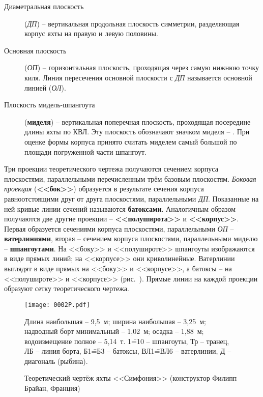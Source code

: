 \begin{description}
\item [Диаметральная плоскость]
  (\textit{ДП}) \--- вертикальная продольная плоскость симметрии,
  разделяющая корпус яхты на правую и левую половины.
\item [Основная плоскость] (\textit{ОП})
  \--- горизонтальная плоскость, проходящая через самую нижнюю точку
  киля. Линия пересечения основной плоскости с \textit{ДП} называется
  основной линией (\textit{ОЛ}).
\item [Плоскость мидель-шпангоута]
  (\textbf{миделя}) \--- вертикальная поперечная
  плоскость, проходящая посередине длины яхты по КВЛ. Эту плоскость
  обозначают значком миделя \--- \midelsign. При оценке формы корпуса
  принято считать миделем самый большой по площади погруженной части
  шпангоут.
\end{description}

Три проекции теоретического чертежа получаются сечением корпуса
плоскостями, параллельными перечисленным трём базовым
плоскостям. \textit{Боковая проекция} (\textbf{<<бок>>}) образуется в
результате сечения корпуса равноотстоящими друг от друга плоскостями,
параллельными \textit{ДП}. Показанные на ней кривые линии сечений
называются \textbf{батоксами}. Аналогичным образом получаются две
другие проекции \--- \textbf{<<полуширота>>} и
\textbf{<<корпус>>}. Первая образуется сечениями корпуса плоскостями,
параллельными \textit{ОП} \--- \textbf{ватерлиниями}, вторая \---
сечением корпуса плоскостями, параллельными миделю \---
\textbf{шпангоутами}. На <<боку>> и <<полушироте>> шпангоуты
изображаются в виде прямых линий; на <<корпусе>> они
криволинейные. Ватерлинии выглядят в виде прямых на <<боку>> и
<<корпусе>>, а батоксы \--- на <<полушироте>> и <<корпусе>>
(рис.~). Прямые линии на каждой проекции образуют сетку
теоретического чертежа.

\begin{figure*}[htb]
   \centering
   \texttt{[image: 0002P.pdf]}
   \caption{Теоретический чертёж яхты <<Симфония>> (конструктор Филипп Брайан, Франция)}
   \label{fig:2}
   \centering{}
   \small  
   Длина наибольшая \--- 9,5~м;
   ширина наибольшая \--- 3,25~м;
   надводный борт минимальный \--- 1,02~м;
   осадка \--- 1,88~м;
   водоизмещение полное \--- 5,14~т.
   1\==10 \--- шпангоуты,
   Тр \--- транец,
   ЛБ \--- линия борта,
   Б1\==Б3 \--- батоксы,
   ВЛ1\==ВЛ6 \--- ватерлинии,
   Д \--- диагональ (рыбина).
\end{figure*}

